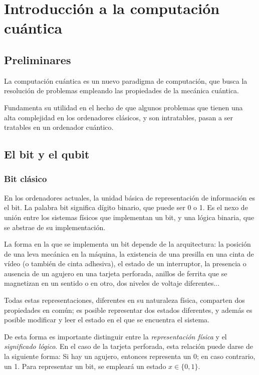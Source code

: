 


\section{Introducción a la computación cuántica}
\subsection{Preliminares}
La computación cuántica es un nuevo paradigma de computación, que busca la
resolución de problemas empleando las propiedades de la mecánica cuántica.

Fundamenta su utilidad en el hecho de que algunos problemas que tienen una alta
complejidad en los ordenadores clásicos, y son intratables, pasan a ser
tratables en un ordenador cuántico.

\subsection{El bit y el qubit}

\subsubsection{Bit clásico}
En los ordenadores actuales, la unidad básica de representación de información 
es el bit. La palabra bit significa dígito binario, que puede ser 0 o 1. Es el 
nexo de unión entre los sistemas físicos que implementan un bit, y una lógica 
binaria, que se abstrae de su implementación.

La forma en la que se implementa un bit depende de la arquitectura: la posición 
de una leva mecánica en la máquina, la existencia de una presilla en una cinta 
de vídeo (o también de cinta adhesiva), el estado de un interruptor, la 
presencia o ausencia de un agujero en una tarjeta perforada, anillos de ferrita 
que se magnetizan en un sentido o en otro, dos niveles de voltaje diferentes...

Todas estas representaciones, diferentes en su naturaleza física, comparten dos 
propiedades en común; es posible representar dos estados diferentes, y además es 
posible modificar y leer el estado en el que se encuentra el sistema.

De esta forma es importante distinguir entre la \textit{representación física} y 
el \textit{significado lógico}. En el caso de la tarjeta perforada, esta 
relación puede darse de la siguiente forma: Si hay un agujero, entonces 
representa un 0; en caso contrario, un 1. Para representar un bit, se empleará 
un estado $x \in \{0, 1\}$.


